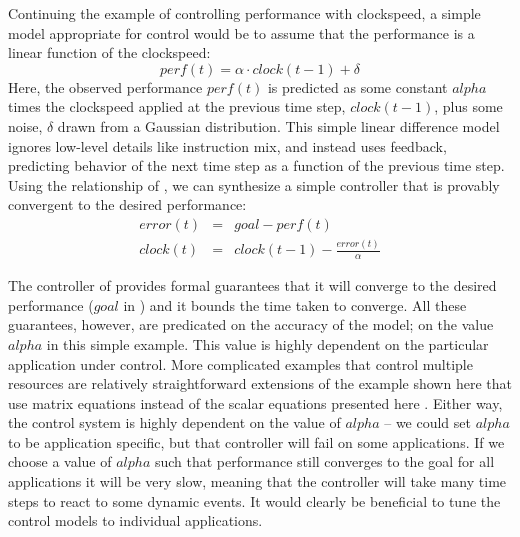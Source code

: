 Continuing the example of controlling performance with clockspeed, a
simple model appropriate for control would be to assume that the
performance is a linear function of the clockspeed:
\begin{equation}
  perf(t) = \alpha \cdot clock(t-1) + \delta \label{eqn:clock}
\end{equation}
Here, the observed performance $perf(t)$ is predicted as some constant
$alpha$ times the clockspeed applied at the previous time step,
$clock(t-1)$, plus some noise, $\delta$ drawn from a Gaussian
distribution.  This simple linear difference model ignores low-level
details like instruction mix, and instead uses feedback, predicting
behavior of the next time step as a function of the previous time
step.  Using the relationship of , we can synthesize a
simple controller that is provably convergent to the desired
performance:
\begin{eqnarray}
  error(t) &=& goal - perf(t) \label{eqn:clock-error} \\
  clock(t) &=& clock(t-1) - \frac{error(t)}{\alpha}
  \label{eqn:clock-control}
\end{eqnarray}


The controller of  provides formal guarantees
that it will converge to the desired performance ($goal$ in
) and it bounds the time taken to converge.  All
these guarantees, however, are predicated on the accuracy of the
model; \ie on the value $alpha$ in this simple example.  This value is
highly dependent on the particular application under control.  More
complicated examples that control multiple resources are relatively
straightforward extensions of the example shown here that use matrix
equations instead of the scalar equations presented here
\cite{METE,others}.  Either way, the control system is highly
dependent on the value of $alpha$ -- we could set $alpha$ to be
application specific, but that controller will fail on some
applications.  If we choose a value of $alpha$ such that performance still
converges to the goal for all applications it will be very slow,
meaning that the controller will take many time steps to react to some
dynamic events.  It would clearly be beneficial to tune the control
models to individual applications.


